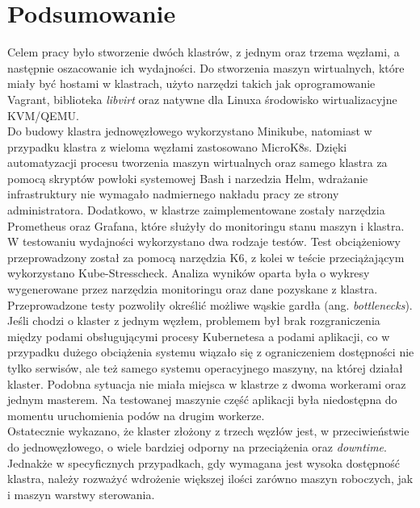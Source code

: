 \chapter{Podsumowanie}

Celem pracy było stworzenie dwóch klastrów, z jednym oraz trzema węzłami, a następnie oszacowanie ich wydajności. Do stworzenia maszyn wirtualnych, które miały być hostami w klastrach, użyto narzędzi takich jak oprogramowanie Vagrant, biblioteka \textit{libvirt} oraz natywne dla Linuxa środowisko wirtualizacyjne KVM/QEMU. \\

Do budowy klastra jednowęzłowego wykorzystano Minikube, natomiast w przypadku klastra z wieloma węzłami zastosowano MicroK8s. Dzięki automatyzacji procesu tworzenia maszyn wirtualnych oraz samego klastra za pomocą skryptów powłoki systemowej Bash i narzedzia Helm, wdrażanie infrastruktury nie wymagało nadmiernego nakładu pracy ze strony administratora. Dodatkowo, w klastrze zaimplementowane zostały narzędzia Prometheus oraz Grafana, które służyły do monitoringu stanu maszyn i klastra. \\

W testowaniu wydajności wykorzystano dwa rodzaje testów. Test obciążeniowy przeprowadzony został za pomocą narzędzia K6, z kolei w teście przeciążającym wykorzystano Kube-Stresscheck. Analiza wyników oparta była o wykresy wygenerowane przez narzędzia monitoringu oraz dane pozyskane z klastra.\\

Przeprowadzone testy pozwoliły określić możliwe wąskie gardła (ang. \textit{bottlenecks}). Jeśli chodzi o klaster z jednym węzłem, problemem był brak rozgraniczenia między podami obsługującymi procesy Kubernetesa a podami aplikacji, co w przypadku dużego obciążenia systemu wiązało się z ograniczeniem dostępności nie tylko serwisów, ale też samego systemu operacyjnego maszyny, na której działał klaster. Podobna sytuacja nie miała miejsca w klastrze z dwoma workerami oraz jednym masterem. Na testowanej maszynie część aplikacji była niedostępna do momentu uruchomienia podów na drugim workerze.\\

Ostatecznie wykazano, że klaster złożony z trzech węzłów jest, w przeciwieństwie do jednowęzłowego, o wiele bardziej odporny na przeciążenia oraz \textit{downtime}. Jednakże w specyficznych przypadkach, gdy wymagana jest wysoka dostępność klastra, należy rozważyć wdrożenie większej ilości zarówno maszyn roboczych, jak i maszyn warstwy sterowania.